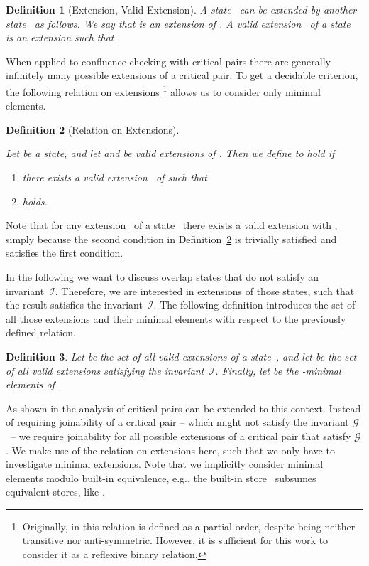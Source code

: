 \documentclass{tlp}
\newtheorem{definition}{Definition}[section]
\newcommand{\mcI}{\ensuremath{\mathcal{I}}}
\newcommand{\mcG}{\ensuremath{\mathcal{G}}}
\begin{document}
\begin{definition}[Extension, Valid Extension] 

A state~ can be \emph{extended} by another
state~ as follows. We say that
 is an \emph{extension} of . A \emph{valid
extension}~ of a state~ is an extension such that
\end{definition}

When applied to confluence checking with critical pairs there are generally
infinitely many possible extensions of a critical pair. To get a decidable
criterion, the following relation on extensions \footnote{Originally, in
\cite{duckstuckeysulzmann07} this relation is defined as a partial order,
despite being neither transitive nor anti-symmetric. However, it is sufficient
for this work to consider it as a reflexive binary relation.} allows us to
consider only minimal elements.

\begin{definition}[Relation on Extensions]\label{def:partialorder}

Let  be a state, and let  and  be valid extensions of . Then we
define  to hold if
\begin{enumerate}
  \item there exists a valid extension~ of  such that 
  \item  holds.
\end{enumerate}
\end{definition}

Note that for any extension~ of a
state~ there exists a valid extension
 with , simply because the second condition in
Definition~\ref{def:partialorder} is trivially satisfied and  satisfies the first condition.

In the following we want to discuss overlap states that do not satisfy an
invariant~\mcI. Therefore, we are interested in extensions of those states, such
that the result satisfies the invariant~\mcI. The following definition introduces
the set of all those extensions and their minimal elements with respect to the
previously defined relation.

\begin{definition}

Let  be the set of all valid extensions of a state~,
and let  be the set of all valid extensions
satisfying the invariant~\mcI. Finally, let  be the
-minimal elements of .
\end{definition}

As shown in \cite{duckstuckeysulzmann07} the analysis of critical pairs can be
extended to this context. Instead of requiring joinability of a critical pair --
which might not satisfy the invariant \mcG\ -- we require joinability for all
possible extensions of a critical pair that satisfy \mcG. We make use of the
relation on extensions here, such that we only have to investigate minimal
extensions. Note that we implicitly consider minimal elements modulo built-in
equivalence, e.g., the built-in store~ subsumes equivalent stores, like
.
\end{document}
